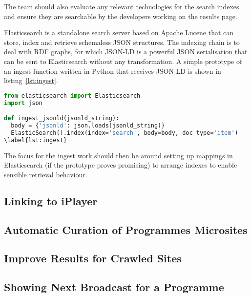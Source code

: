 The team should also evaluate any relevant technologies for the
search indexes and ensure they are searchable by the
developers working on the results page.

Elasticsearch is a standalone search server based on Apache Lucene
that can store, index and retrieve schemaless JSON structures.
The indexing chain is to deal with RDF graphs, for which JSON-LD
is a powerful JSON serialisation that can be sent to Elasticsearch
without any transformation.
A simple prototype of an ingest function written in Python
that receives JSON-LD is shown in listing~\ref{lst:ingest}.

\begin{lstlisting}[language=Python]
from elasticsearch import Elasticsearch
import json

def ingest_jsonld(jsonld_string):
  body = {'jsonld': json.loads(jsonld_string)}
  ElasticSearch().index(index='search', body=body, doc_type='item')
\label{lst:ingest}
\end{lstlisting}

The focus for the ingest work should then be around setting
up mappings in Elasticsearch (if the prototype proves promising)
to arrange indexes to enable sensible retrieval behaviour.


\subsection{Linking to iPlayer}


\subsection{Automatic Curation of Programmes Microsites}


\subsection{Improve Results for Crawled Sites}


\subsection{Showing Next Broadcast for a Programme}

